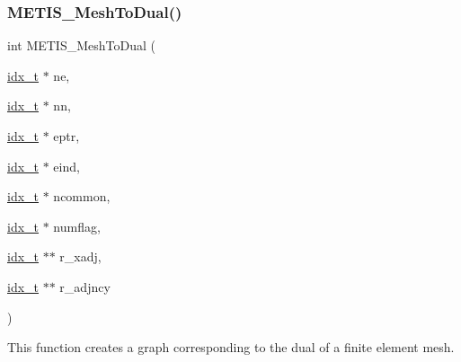\subsubsection{\texorpdfstring{M\+E\+T\+I\+S\+\_\+\+Mesh\+To\+Dual()}{METIS\_MeshToDual()}}
{\footnotesize\ttfamily int M\+E\+T\+I\+S\+\_\+\+Mesh\+To\+Dual (\begin{DoxyParamCaption}\item[{\hyperlink{a00876_aaa5262be3e700770163401acb0150f52}{idx\+\_\+t} $\ast$}]{ne,  }\item[{\hyperlink{a00876_aaa5262be3e700770163401acb0150f52}{idx\+\_\+t} $\ast$}]{nn,  }\item[{\hyperlink{a00876_aaa5262be3e700770163401acb0150f52}{idx\+\_\+t} $\ast$}]{eptr,  }\item[{\hyperlink{a00876_aaa5262be3e700770163401acb0150f52}{idx\+\_\+t} $\ast$}]{eind,  }\item[{\hyperlink{a00876_aaa5262be3e700770163401acb0150f52}{idx\+\_\+t} $\ast$}]{ncommon,  }\item[{\hyperlink{a00876_aaa5262be3e700770163401acb0150f52}{idx\+\_\+t} $\ast$}]{numflag,  }\item[{\hyperlink{a00876_aaa5262be3e700770163401acb0150f52}{idx\+\_\+t} $\ast$$\ast$}]{r\+\_\+xadj,  }\item[{\hyperlink{a00876_aaa5262be3e700770163401acb0150f52}{idx\+\_\+t} $\ast$$\ast$}]{r\+\_\+adjncy }\end{DoxyParamCaption})}

This function creates a graph corresponding to the dual of a finite element mesh.


